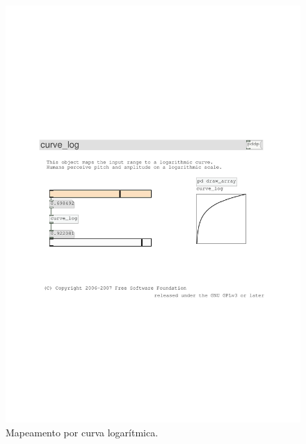 \documentclass[draft]{ppgmus}
\begin{document}
\begin{figure}
\includegraphics[scale=.6]{mapping4}
\caption{Mapeamento por curva logarítmica.}
\label{mapping4}
\end{figure}
\end{document}
